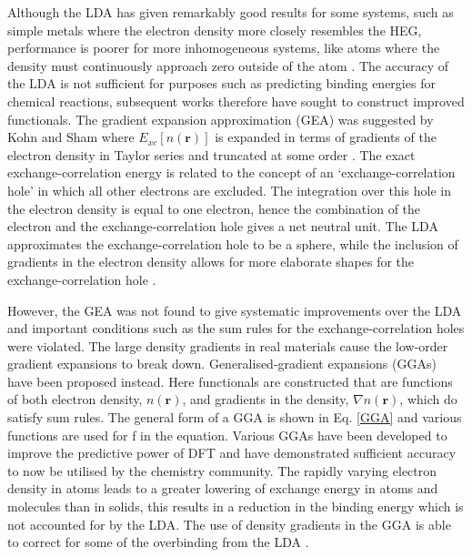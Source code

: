\documentclass[11pt, twoside]{report}
\begin{document}
Although the LDA has given remarkably good results for some systems, such as simple metals where the electron density more closely resembles the HEG, performance is poorer for more inhomogeneous systems, like atoms where the density must continuously approach zero outside of the atom \cite{RichardMartin_Ch8}. The accuracy of the LDA is not sufficient for purposes such as predicting binding energies for chemical reactions, subsequent works therefore have sought to construct improved functionals. 
The gradient expansion approximation (GEA) was suggested by Kohn and Sham \cite{Kohn_Sham1965} where $E_{xc}[n(\mathbf{r})]$ is expanded in terms of gradients of the electron density in Taylor series and truncated at some order \cite{Prasad_ch3}.
The exact exchange-correlation energy is related to the concept of an `exchange-correlation hole' in which all other electrons are excluded. The integration over this hole in the electron density is equal to one electron, hence the combination of the electron and the exchange-correlation hole gives a net neutral unit. The LDA approximates the exchange-correlation hole to be a sphere, while the inclusion of gradients in the electron density allows for more elaborate shapes for the exchange-correlation hole \cite{RichardMartin_Ch7}.

However, the GEA was not found to give systematic improvements over the LDA and important conditions such as the sum rules for the exchange-correlation holes were violated. The large density gradients in real materials cause the low-order gradient expansions to break down. 
Generalised-gradient expansions (GGAs) have been proposed instead.
Here functionals are constructed that are functions of both electron density, $n(\mathbf{r})$, and gradients in the density, $\nabla n(\mathbf{r})$, which do satisfy sum rules. The general form of a GGA is shown in Eq. \ref{GGA} and various functions are used for f in the equation.
Various GGAs have been developed to improve the predictive power of DFT and have demonstrated sufficient accuracy to now be utilised by the chemistry community.
The rapidly varying electron density in atoms leads to a greater lowering of exchange energy in atoms and molecules than in solids, this results in a reduction in the binding energy which is not accounted for by the LDA. The use of density gradients in the GGA is able to correct for some of the overbinding from the LDA \cite{RichardMartin_Ch8}. 
\end{document}
